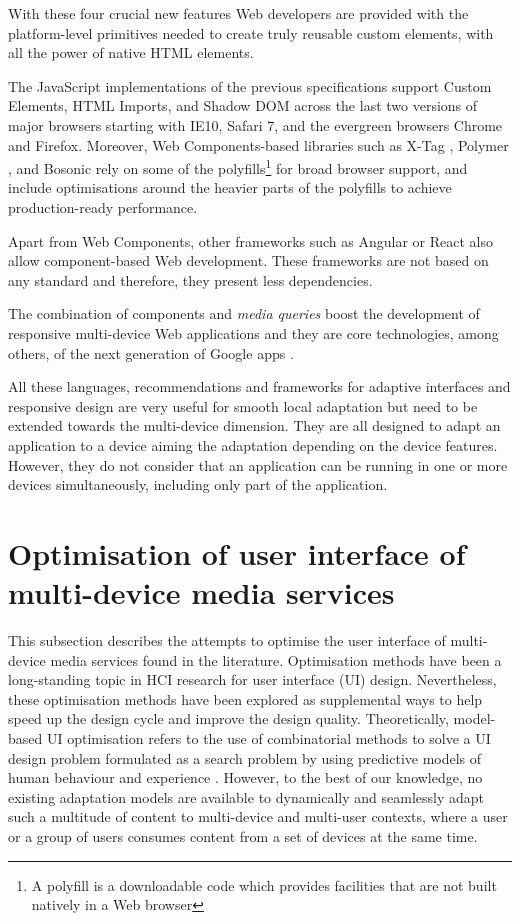 With these four crucial new features Web developers are provided with the platform-level primitives needed to create truly reusable custom elements, with all the power of native HTML elements.

The JavaScript implementations of the previous specifications support Custom Elements, HTML Imports, and Shadow DOM across the last two versions of major browsers starting with IE10, Safari 7, and the evergreen browsers Chrome and Firefox. Moreover, Web Components-based libraries such as X-Tag \cite{xtag}, Polymer \cite{polymer}, and Bosonic \cite{bosonic} rely on some of the polyfills\footnote{A polyfill is a downloadable code which provides facilities that are not built natively in a Web browser} for broad browser support, and include optimisations around the heavier parts of the polyfills to achieve production-ready performance.

Apart from Web Components, other frameworks such as Angular or React also allow component-based Web development. These frameworks are not based on any standard and therefore, they present less dependencies. 

The combination of components and \textit{media queries} boost the development of responsive multi-device Web applications and they are core technologies, among others, of the next generation of Google apps \cite{T2013G}.

All these languages, recommendations and frameworks for adaptive interfaces and responsive design are very useful for smooth local adaptation but need to be extended towards the multi-device dimension. They are all designed to adapt an application to a device aiming the adaptation depending on the device features. However, they do not consider that an application can be running in one or more devices simultaneously, including only part of the application.

\section{Optimisation of user interface of multi-device media services} \label{UIOpt}
This subsection describes the attempts to optimise the user interface of multi-device media services found in the literature. Optimisation methods have been a long-standing topic in HCI research for user interface (UI) design. Nevertheless, these optimisation methods have been explored as supplemental ways to help speed up the design cycle and improve the design quality. Theoretically, model-based UI optimisation refers to the use of combinatorial methods to solve a UI design problem formulated as a search problem by using predictive models of human behaviour and experience \cite{oulasvirta2017user}. However, to the best of our knowledge, no existing adaptation models are available to dynamically and seamlessly adapt such a multitude of content to multi-device and multi-user contexts, where a user or a group of users consumes content from a set of devices at the same time.

